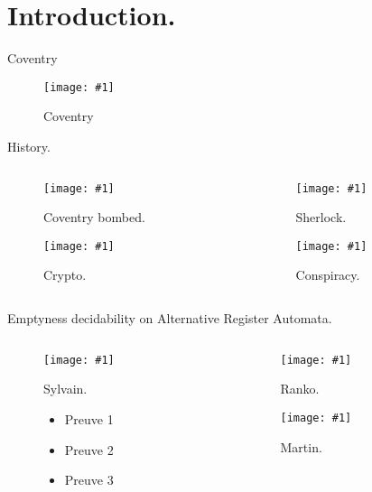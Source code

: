 \documentclass{beamer}
\newcommand{\insertfigure}[3] {

\begin{minipage}[b]{#2\linewidth}
    \texttt{[image: \#1]} 
    \caption{#3} 
\end{minipage} }
\newcommand{\insertf}[2]{\insertfigure{#1}{0.9}{#2}}
\newcommand{\insertpicture}[2]{
\begin{center}
  \begin{figure}
    \insertf{#1}{#2}
 \end{figure}
\end{center}
}
\begin{document}
\section{Introduction.}

\begin{frame}{Coventry}
  \insertpicture{pictures/coventry.jpg}{Coventry}
\end{frame}
\begin{frame}{History.}
\begin{columns}[T] %
\begin{column}{.48\textwidth}
\begin{figure}
  
  \insertf{coventryb.jpg}{Coventry bombed.}
  \pause
  \insertf{pictures/crypto.jpg}{Crypto.}
  \pause

 
\end{figure}
\end{column}%
\begin{column}{.40\textwidth}

\begin{figure}
  
  \insertf{pictures/Sherlock.jpg}{Sherlock.}
  \pause
  \insertf{pictures/consp.jpg}{Conspiracy.}
  
 
\end{figure}

  \end{column}%
\end{columns}

\end{frame}

\begin{frame}{Emptyness decidability on Alternative Register Automata.}
\begin{columns}[T] %
\begin{column}{.48\textwidth}
\begin{figure}
  
  \insertf{coventryb.jpg}{Sylvain.}
  \pause
  \begin{itemize}
   \item Preuve 1 \pause
   \item Preuve 2 \pause
   \item Preuve 3 \pause
  \end{itemize}

 
\end{figure}
\end{column}%
\begin{column}{.40\textwidth}

\begin{figure}
  
  \insertf{pictures/Sherlock.jpg}{Ranko.}
  \pause
  \insertf{pictures/consp.jpg}{Martin.}
  
 
\end{figure}

  \end{column}%
\end{columns}

\end{frame}
\end{document}
